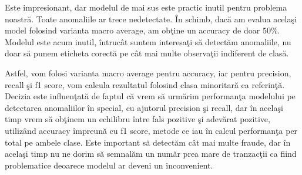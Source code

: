 Este impresionant, dar modelul de mai sus este practic inutil pentru problema noastră.
Toate anomaliile ar trece nedetectate. În schimb, dacă am evalua acelaşi model folosind
varianta macro average, am obţine un accuracy de doar $50\%$. Modelul este acum inutil,
întrucât suntem interesaţi să detectăm anomaliile, nu doar să punem eticheta corectă 
pe cât mai multe observaţii indiferent de clasă.

Astfel, vom folosi varianta macro average pentru accuracy, iar pentru precision, recall şi 
f1 score, vom calcula rezultatul folosind clasa minoritară ca referinţă. Decizia este influenţată
de faptul că vrem să urmărim performanţa modelului pe detectarea anomaliilor în special, cu ajutorul
precision şi recall, dar în acelaşi timp vrem să obţinem un echilibru între fals pozitive şi 
adevărat pozitive, utilizând accuracy împreună cu f1 score, metode ce iau în calcul performanţa 
per total pe ambele clase. Este important să detectăm cât mai multe fraude, dar în acelaşi timp 
nu ne dorim să semnalăm un număr prea mare de tranzacţii ca fiind problematice deoarece modelul 
ar deveni un inconvenient.